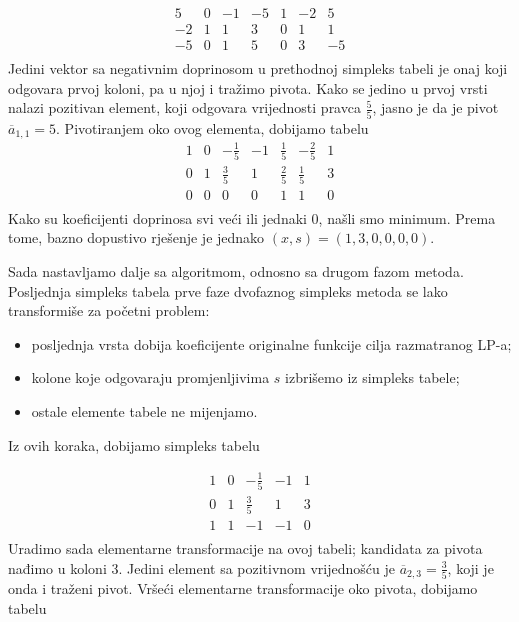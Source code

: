 \documentclass[a4paper, utf8, 11pt, colorlinks]{book}
\theoremstyle{definition}
\begin{document}
$$ \begin{array}{cccccc|c}
 	 5 & 0 & -1 & -5 & 1 & -2 & 5 \\
	-2&1  & 1 & 3 & 0 & 1 & 1 \\ \hline
	 -5 & 0 & 1 & 5 & 0 & 3 & -5 \\
 \end{array}
 $$
 Jedini vektor sa negativnim doprinosom u prethodnoj simpleks tabeli je 
 onaj koji odgovara prvoj koloni, pa u njoj i tražimo pivota.  
 Kako se jedino u prvoj vrsti nalazi pozitivan element, koji odgovara vrijednosti pravca $\frac{5}{5}$, jasno je da je pivot $\overline{a}_{1,1}=5$. Pivotiranjem oko ovog elementa, dobijamo tabelu 
 $$ \begin{array}{cccccc|c}
        1 & 0 & -\frac{1}{5}  & -1   &  \frac{1}{5}     & -\frac{2}{5}  & 1                    \\
        0 & 1 & \frac{3}{5}   &  1   &   \frac{2}{5}  & \frac{1}{5}      & 3                   \\ \hline
        0 & 0 & 0            &  0   &   1        & 1                     & 0                                 \\
    \end{array}
$$
Kako su koeficijenti doprinosa svi veći ili jednaki 0, našli smo minimum. 
Prema tome, bazno dopustivo rješenje je jednako $(x, s)= (1,3, 0, 0, 0, 0)$. 

Sada nastavljamo dalje sa algoritmom, odnosno sa drugom fazom metoda.  Posljednja simpleks tabela prve faze dvofaznog simpleks metoda se lako transformiše za početni problem: 
 
\begin{itemize}
	\item posljednja vrsta dobija koeficijente originalne funkcije cilja razmatranog LP-a;
	\item kolone koje odgovaraju promjenljivima $s$ izbrišemo iz simpleks tabele;
	\item ostale elemente tabele ne mijenjamo.
\end{itemize}
Iz ovih koraka, dobijamo simpleks tabelu 

 $$ \begin{array}{cccc|c}
 	   1 & 0 & -\frac{1}{5}     & -1   & 1 \\
 	   0 & 1 & \frac{3}{5}      & 1    & 3 \\ \hline
       1 & 1 & -1               & -1   & 0 \\
    \end{array}
$$
Uradimo sada elementarne transformacije na ovoj tabeli; kandidata za pivota nađimo u 
koloni 3. Jedini element sa pozitivnom vrijednošću je $\overline{a}_{2,3} = \frac{3}{5}$, koji je onda i traženi pivot. 
Vršeći elementarne transformacije oko pivota, dobijamo tabelu 
\end{document}
